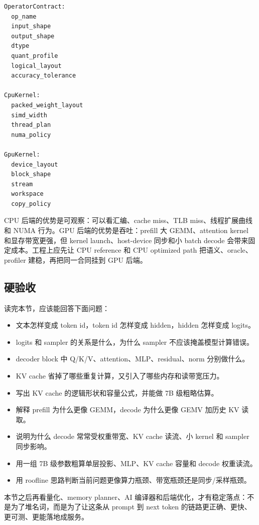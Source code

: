 \begin{lstlisting}[numbers=none,caption={共享算子合同，分离后端实现}]
OperatorContract:
  op_name
  input_shape
  output_shape
  dtype
  quant_profile
  logical_layout
  accuracy_tolerance

CpuKernel:
  packed_weight_layout
  simd_width
  thread_plan
  numa_policy

GpuKernel:
  device_layout
  block_shape
  stream
  workspace
  copy_policy
\end{lstlisting}

CPU 后端的优势是可观察：可以看汇编、cache miss、TLB miss、线程扩展曲线和 NUMA 行为。GPU 后端的优势是吞吐：prefill 大 GEMM、attention kernel 和显存带宽更强，但 kernel launch、host-device 同步和小 batch decode 会带来固定成本。工程上应先让 CPU reference 和 CPU optimized path 把语义、oracle、profiler 建稳，再把同一合同挂到 GPU 后端。

\subsection{硬验收}

读完本节，应该能回答下面问题：

\begin{itemize}
  \item 文本怎样变成 token id，token id 怎样变成 hidden，hidden 怎样变成 logits。
  \item logits 和 sampler 的关系是什么，为什么 sampler 不应该掩盖模型计算错误。
  \item decoder block 中 Q/K/V、attention、MLP、residual、norm 分别做什么。
  \item KV cache 省掉了哪些重复计算，又引入了哪些内存和读带宽压力。
  \item 写出 KV cache 的逻辑形状和容量公式，并能做 7B 级粗略估算。
  \item 解释 prefill 为什么更像 GEMM，decode 为什么更像 GEMV 加历史 KV 读取。
  \item 说明为什么 decode 常常受权重带宽、KV cache 读流、小 kernel 和 sampler 同步影响。
  \item 用一组 7B 级参数粗算单层投影、MLP、KV cache 容量和 decode 权重读流。
  \item 用 roofline 思路判断当前问题更像算力瓶颈、带宽瓶颈还是同步/采样瓶颈。
\end{itemize}

本节之后再看量化、memory planner、AI 编译器和后端优化，才有稳定落点：不是为了堆名词，而是为了让这条从 prompt 到 next token 的链路更正确、更快、更可测、更能落地成服务。
